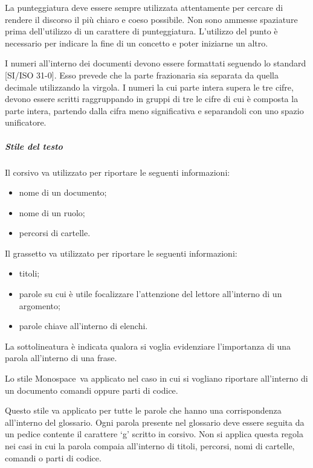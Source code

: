 \documentclass[../NormeProgetto.tex]{subfiles}
\begin{document}
			La punteggiatura  deve essere sempre utilizzata attentamente per cercare di rendere il discorso il più chiaro e coeso possibile. Non sono ammesse spaziature prima dell'utilizzo di un carattere di punteggiatura. L'utilizzo del punto è necessario per indicare la fine di un concetto e poter iniziarne un altro.
			
			I numeri all'interno dei documenti devono essere formattati seguendo lo standard [SI/ISO 31-0]. Esso prevede che la parte frazionaria sia separata da quella decimale utilizzando la virgola. I numeri la cui parte intera supera le tre cifre, devono essere scritti raggruppando in gruppi di tre le cifre di cui è composta la parte intera, partendo dalla cifra meno significativa e separandoli con uno spazio unificatore.
			
		\subparagraph{Stile del testo}

			Il corsivo va utilizzato per riportare le seguenti informazioni:
			\begin{itemize}
				\item nome di un documento;
				\item nome di un ruolo;
				\item percorsi di cartelle.
			\end{itemize}						
			
			Il grassetto va utilizzato per riportare le seguenti informazioni:
			\begin{itemize}
				\item titoli;
				\item parole su cui è utile focalizzare l'attenzione del lettore all'interno di un argomento;
				\item parole chiave all'interno di elenchi.
			\end{itemize}						
			
			La sottolineatura è indicata qualora si voglia evidenziare l'importanza di una parola all'interno di una frase.					
			
			Lo stile Monospace\g\ va applicato nel caso in cui si vogliano riportare all'interno di un documento	comandi oppure parti di codice.
			
			\label{sec:Formattazione termini nel glossario}
			Questo stile va applicato per tutte le parole che hanno una corrispondenza all'interno del glossario. Ogni parola presente nel glossario deve essere seguita da un pedice contente il carattere `g' scritto in corsivo. Non si applica questa regola nei casi in cui la parola compaia all'interno di titoli, percorsi, nomi di cartelle, comandi o parti di codice.
			
\end{document}

